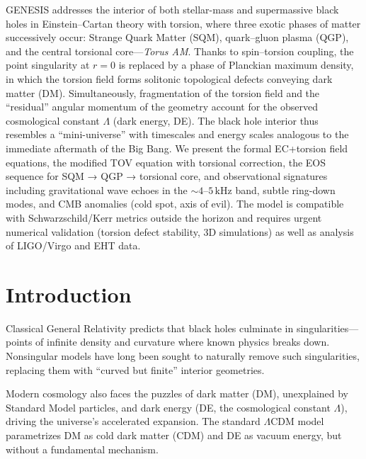 \documentclass{article}
\begin{document}
GENESIS addresses the interior of both stellar-mass and supermassive black holes in Einstein–Cartan theory with torsion, where three exotic phases of matter successively occur: Strange Quark Matter (SQM), quark–gluon plasma (QGP), and the central torsional core—\emph{Torus AM}. Thanks to spin–torsion coupling, the point singularity at $r=0$ is replaced by a phase of Planckian maximum density, in which the torsion field forms solitonic topological defects conveying dark matter (DM). Simultaneously, fragmentation of the torsion field and the “residual” angular momentum of the geometry account for the observed cosmological constant $\Lambda$ (dark energy, DE). The black hole interior thus resembles a “mini-universe” with timescales and energy scales analogous to the immediate aftermath of the Big Bang. We present the formal EC+torsion field equations, the modified TOV equation with torsional correction, the EOS sequence for SQM → QGP → torsional core, and observational signatures including gravitational wave echoes in the $\sim4$–$5\,\mathrm{kHz}$ band, subtle ring-down modes, and CMB anomalies (cold spot, axis of evil). The model is compatible with Schwarzschild/Kerr metrics outside the horizon and requires urgent numerical validation (torsion defect stability, 3D simulations) as well as analysis of LIGO/Virgo and EHT data.

\clearpage

\tableofcontents
\thispagestyle{empty}
\clearpage

\section{Introduction}\label{sec:intro}
Classical General Relativity predicts that black holes culminate in singularities—points of infinite density and curvature where known physics breaks down. Nonsingular models have long been sought to naturally remove such singularities, replacing them with “curved but finite” interior geometries.

Modern cosmology also faces the puzzles of dark matter (DM), unexplained by Standard Model particles, and dark energy (DE, the cosmological constant $\Lambda$), driving the universe’s accelerated expansion. The standard $\Lambda$CDM model parametrizes DM as cold dark matter (CDM) and DE as vacuum energy, but without a fundamental mechanism.
\end{document}
